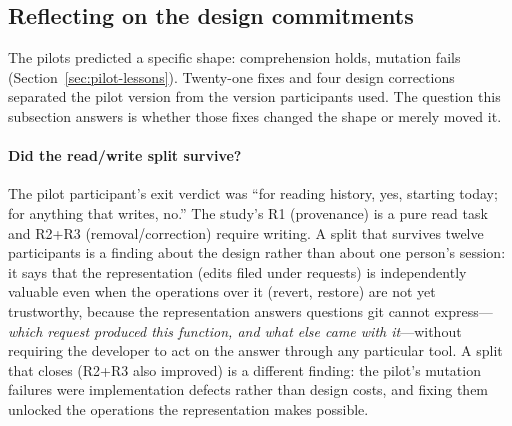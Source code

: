 \subsection{Reflecting on the design commitments}
\label{sec:findings-reflection}

The pilots predicted a specific shape: comprehension holds, mutation fails
(Section~\ref{sec:pilot-lessons}). Twenty-one fixes and four design corrections
separated the pilot version from the version participants used. The question this
subsection answers is whether those fixes changed the shape or merely moved it.

\paragraph{Did the read/write split survive?}
The pilot participant's exit verdict was ``for reading history, yes, starting
today; for anything that writes, no.'' The study's R1 (provenance) is a pure
read task and R2+R3 (removal/correction) require writing. A split that
survives twelve participants is a finding about the design rather than about
one person's session: it says that the representation (edits filed under
requests) is independently valuable even when the operations over it (revert,
restore) are not yet trustworthy, because the representation answers questions
git cannot express---\emph{which request produced this function, and what else
came with it}---without requiring the developer to act on the answer through
any particular tool. A split that closes (R2+R3 also improved) is a different
finding: the pilot's mutation failures were implementation defects rather than
design costs, and fixing them unlocked the operations the representation makes
possible.

